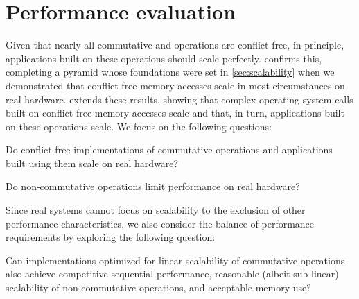 \section{Performance evaluation}
\label{sec:eval}


Given that nearly all commutative \fs and \vm operations are
conflict-free, in principle, applications built on these operations
should scale perfectly.
%
 confirms this, completing a pyramid whose
foundations were set in \cref{sec:scalability} when we demonstrated
that conflict-free memory accesses scale in most circumstances on real
hardware.
%
 extends these results, showing that complex
operating system calls built on conflict-free memory accesses scale
and that, in turn, applications built on these operations scale.
%
We focus on the following questions:

\begin{CompactItemize}

\item Do conflict-free implementations of commutative operations and
  applications built using them scale on real hardware?

\item Do non-commutative operations limit performance on real
  hardware?


\end{CompactItemize}

Since real systems cannot focus on scalability to the exclusion of
other performance characteristics, we also consider the balance of
performance requirements by exploring the following question:

\begin{CompactItemize}

\item Can implementations optimized for linear scalability of
  commutative operations also achieve competitive sequential
  performance, reasonable (albeit sub-linear) scalability of
  non-commutative operations, and acceptable memory use?

\end{CompactItemize}


